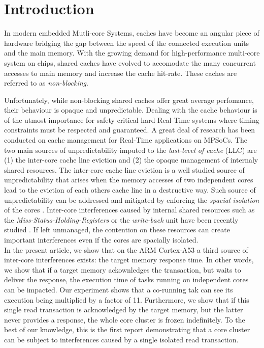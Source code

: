 \section{Introduction}
    In modern embedded Mutli-core Systems, caches have become an angular piece of hardware bridging the gap between the speed of the connected execution units and the main memory.
    With the growing demand for high-performance multi-core system on chips, shared caches have evolved to accomodate the many concurrent accesses to main memory and increase the cache hit-rate.
    These caches are referred to as \emph{non-blocking}.

    Unfortunately, while non-blocking shared caches offer great average perfomance, their behaviour is opaque and unpredictable.
    Dealing with the cache behaviour is of the utmost importance for safety critical hard Real-Time systems where timing constraints must be respected and guaranteed.
    A great deal of research has been conducted on cache management for Real-Time applications on MPSoCs.
    The two main sources of unpredictability imputed to the \emph{last-level of cache} (LLC) are (1) the inter-core cache line eviction and (2) the opaque management of internaly shared resources.
    The inter-core cache line eviction is a well studied source of unpredictability that arises when the memory accesses of two independent cores lead to the eviction of each others cache line in a destructive way.
    Such source of unpredictability can be addressed and mitigated by enforcing the \emph{spacial isolation} of the cores \cite{Mancuso2013RealtimeCM, 6755286}.
    Inter-core interferences caused by internal shared resources such as the \emph{Miss-Status-Holding-Registers} or the \emph{write-back} unit have been recently studied \cite{Valsan2017AddressingIC, Heechul_DDOS_attacks_on_shared_cache}.
    If left unmanaged, the contention on these resources can create important interferences even if the cores are spacially isolated.\\

    In the present article, we show that on the ARM Cortex-A53 \cite{ARM-cortex-A53} a third source of inter-core interferences exists: the target memory response time.
    In other words, we show that if a target memory ackownledges the transaction, but waits to deliver the response, the execution time of tasks running on independent cores can be impacted.
    Our experiment shows that a co-running tak can see its execution being multiplied by a factor of 11.
    Furthermore, we show that if this single read transaction is acknowledged by the target memory, but the latter never provides a response, the whole core cluster is frozen indefinitely.
    To the best of our knowledge, this is the first report demonstrating that a core cluster can be subject to interferences caused by a single isolated read transaction.
